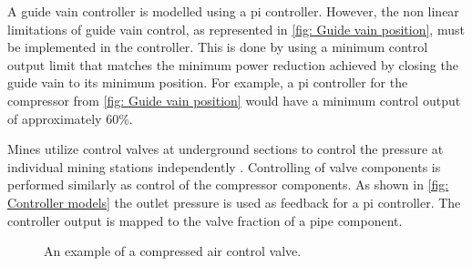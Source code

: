		A guide vain controller is modelled using a \gls{pi} controller. However, the non linear limitations of guide vain control, as represented in \cref{fig: Guide vain position}, must be implemented in the controller. This is done by using a minimum control output limit that matches the minimum power reduction  achieved by closing the guide vain to its minimum position. For example, a \gls{pi} controller for the compressor from \cref{fig: Guide vain position} would have a minimum control output of approximately 60\%.
		\par 
		Mines utilize control valves at underground sections to control the pressure at individual mining stations independently \cite{Heyns2014Masters}. Controlling of valve components is performed similarly as control of the compressor components. As shown in \cref{fig: Controller models} the outlet pressure is used as feedback for a pi controller. The controller output is mapped to the valve fraction of a pipe component.
		\begin{figure}[h]
			\centering
			\caption[An example of a compressed air control valve.]{An example of a compressed air control valve\cite{van2015implementation}.} 
			\label{fig: Control}
		\end{figure}
